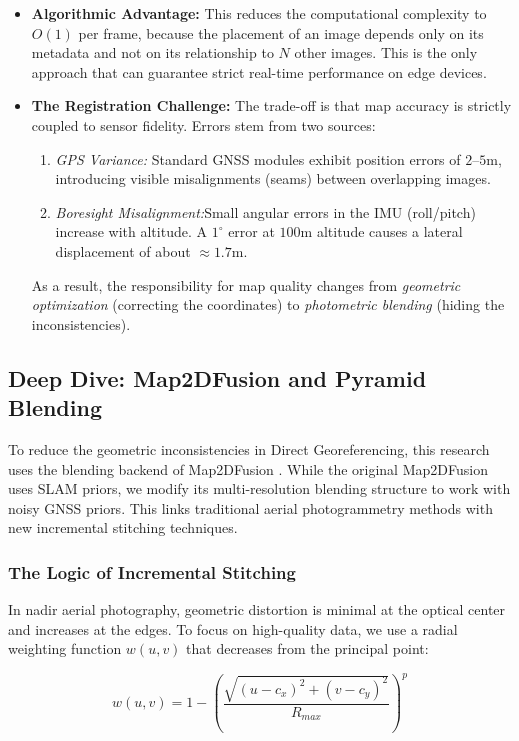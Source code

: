 \documentclass[conference]{IEEEtran}
\begin{document}
\begin{itemize}
    \item \textbf{Algorithmic Advantage:} This reduces the computational complexity to $O(1)$ per frame, because the placement of an image depends only on its metadata and not on its relationship to $N$ other images. This is the only approach that can guarantee strict real-time performance on edge devices.
    \item \textbf{The Registration Challenge:} The trade-off is that map accuracy is strictly coupled to sensor fidelity. Errors stem from two sources:
    \begin{enumerate}
        \item \textit{GPS Variance:} Standard GNSS modules exhibit position errors of $2$--$5$m, introducing visible misalignments (seams) between overlapping images.
        \item \textit{Boresight Misalignment:}Small angular errors in the IMU (roll/pitch) increase with altitude. A $1^{\circ}$ error at $100$m altitude causes a lateral displacement of about $\approx 1.7$m.
    \end{enumerate}
    As a result, the responsibility for map quality changes from \textit{geometric optimization} (correcting the coordinates) to \textit{photometric blending} (hiding the inconsistencies).
\end{itemize}


\subsection{Deep Dive: Map2DFusion and Pyramid Blending}
To reduce the geometric inconsistencies in Direct Georeferencing, this research uses the blending backend of Map2DFusion \cite{map2dfusion}. While the original Map2DFusion uses SLAM priors, we modify its multi-resolution blending structure to work with noisy GNSS priors. This links traditional aerial photogrammetry methods with new incremental stitching techniques.

\subsubsection{The Logic of Incremental Stitching}
In nadir aerial photography, geometric distortion is minimal at the optical center and increases at the edges. To focus on high-quality data, we use a radial weighting function $w(u, v)$ that decreases from the principal point:

\begin{equation} \label{eq:weighting}
w(u, v) = 1 - \left( \frac{\sqrt{(u - c_x)^2 + (v - c_y)^2}}{R_{max}} \right)^p
\end{equation}
\end{document}
